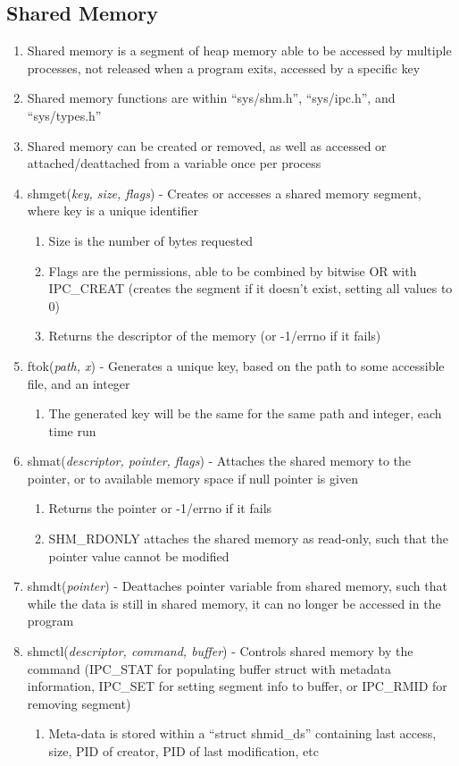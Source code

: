 \documentclass[11 pt, twoside]{article}
\begin{document}
\subsection{Shared Memory}
\begin{enumerate}
\item Shared memory is a segment of heap memory able to be accessed by multiple processes, not released when a program exits, accessed by a specific key
\item Shared memory functions are within ``sys/shm.h'', ``sys/ipc.h'', and ``sys/types.h''
\item Shared memory can be created or removed, as well as accessed or attached/deattached from a variable once per process
\item shmget(\textit{key, size, flags}) - Creates or accesses a shared memory segment, where key is a unique identifier
\begin{enumerate}
\item Size is the number of bytes requested
\item Flags are the permissions, able to be combined by bitwise OR with IPC\_CREAT (creates the segment if it doesn't exist, setting all values to 0) 
\item Returns the descriptor of the memory (or -1/errno if it fails)
\end{enumerate}
\item ftok(\textit{path, x}) - Generates a unique key, based on the path to some accessible file, and an integer
\begin{enumerate}
\item The generated key will be the same for the same path and integer, each time run
\end{enumerate}
\item shmat(\textit{descriptor, pointer, flags}) - Attaches the shared memory to the pointer, or to available memory space if null pointer is given
\begin{enumerate}
\item Returns the pointer or -1/errno if it fails
\item SHM\_RDONLY attaches the shared memory as read-only, such that the pointer value cannot be modified
\end{enumerate}
\item shmdt(\textit{pointer}) - Deattaches pointer variable from shared memory, such that while the data is still in shared memory, it can no longer be accessed in the program
\item shmctl(\textit{descriptor, command, buffer}) - Controls shared memory by the command (IPC\_STAT for populating buffer struct with metadata information, IPC\_SET for setting segment info to buffer, or IPC\_RMID for removing segment)
\begin{enumerate}
\item Meta-data is stored within a ``struct shmid\_ds'' containing last access, size, PID of creator, PID of last modification, etc
\end{enumerate}
\end{enumerate}
\end{document}
